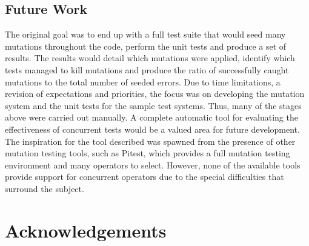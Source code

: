 \documentclass[a4paper,12pt]{article}
\begin{document}
\subsection{Future Work}
The original goal was to end up with a full test suite that would seed many mutations throughout the code, perform the unit tests and produce a set of results. The results would detail which mutations were applied, identify which tests managed to kill mutations and produce the ratio of successfully caught mutations to the total number of seeded errors. Due to time limitations, a revision of expectations and priorities, the focus was on developing the mutation system and the unit tests for the sample test systems. Thus, many of the stages above were carried out manually. A complete automatic tool for evaluating the effectiveness of concurrent tests would be a valued area for future development. The inspiration for the tool described was spawned from the presence of other mutation testing tools, such as Pitest, which provides a full mutation testing environment and many operators to select. However, none of the available tools provide support for concurrent operators due to the special difficulties that surround the subject.
    
\newpage
\section{Acknowledgements}



\newpage
\appendix
\end{document}
